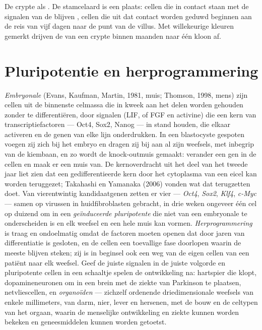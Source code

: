 \begin{omfigure}
{\small De crypte als . De stamcelaard is een plaats: cellen die in
contact staan met de signalen van de  blijven ,
cellen die uit dat contact worden geduwd beginnen aan de reis van vijf
dagen naar de punt van de villus. Met willekeurige kleuren gemerkt
drijven de  van een crypte binnen maanden naar één kloon af.}
\end{omfigure}

\section{Pluripotentie en herprogrammering}

\begin{definition}\label{def:b3:stem-cells:pluripotency}
\emph{Embryonale } (Evans, Kaufman, Martin, 1981, muis;
Thomson, 1998, mens) zijn cellen uit de binnenste celmassa die in kweek
aan het delen worden gehouden zonder te differentiëren, door signalen
(LIF, of FGF en activine) die een kern van transcriptiefactoren ---
Oct4, Sox2, Nanog --- in stand houden, die elkaar activeren en de genen
van elke lijn onderdrukken. In een blastocyste gespoten voegen zij zich
bij het embryo en dragen zij bij aan al zijn weefsels, met inbegrip van
de kiembaan, en zo wordt de knock-outmuis gemaakt: verander een gen in
de cellen en maak er een muis van. De kernoverdracht uit het deel van
het tweede jaar liet zien dat een gedifferentieerde kern door het
cytoplasma van een eicel kan worden teruggezet; Takahashi en Yamanaka
(2006) vonden wat dat terugzetten doet. Van vierentwintig
kandidaatgenen zetten er vier --- \emph{Oct4}, \emph{Sox2},
\emph{Klf4}, \emph{c-Myc} --- samen op virussen in huidfibroblasten
gebracht, in drie weken ongeveer één cel op duizend om in een
\emph{geïnduceerde pluripotente } die niet van een embryonale te
onderscheiden is en elk weefsel en een hele muis kan vormen.
\emph{Herprogrammering} is traag en ondoelmatig omdat de factoren
 moeten openen dat door jaren van differentiatie is gesloten,
en de cellen een toevallige fase doorlopen waarin de meeste blijven
steken; zij is in beginsel ook een weg van de eigen cellen van een
patiënt naar elk weefsel. Geef de juiste signalen in de juiste volgorde
en pluripotente cellen in een schaaltje spelen de ontwikkeling na:
hartspier die klopt, dopamineneuronen om in een brein met de ziekte van
Parkinson te plaatsen, netvliescellen, en \emph{organoïden} --- zichzelf
ordenende driedimensionale weefsels van enkele millimeters, van darm,
nier, lever en hersenen, met de bouw en de celtypen van het orgaan,
waarin de menselijke ontwikkeling en ziekte kunnen worden bekeken en
geneesmiddelen kunnen worden getoetst.
\end{definition}

